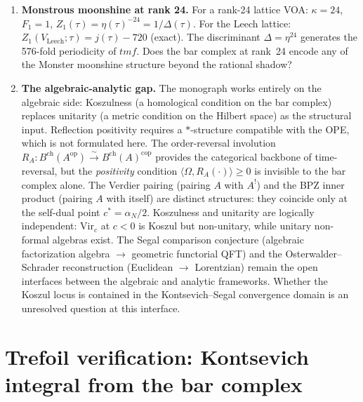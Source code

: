 \documentclass[11pt]{article}
\begin{document}
\begin{enumerate}
  class~$\mathbf{M}$ at $|c| < 6$ diverges geometrically
  with growth rate~$\rho > 1$.  Is this divergent series Borel
  summable?  The expected Stokes structure: in the Euclidean
  frame, the Borel singularities lie on the real axis at
  $\xi = 1/\rho$; the Wick rotation moves them to the imaginary
  axis, clearing the integration contour.
  The modular $S$-transform at the $q \to 1$ boundary
  plays the structural role of Borel resummation.
\item \textbf{Monstrous moonshine at rank 24.}
  For a rank-24 lattice VOA: $\kappa = 24$, $F_1 = 1$,
  $Z_1(\tau) = \eta(\tau)^{-24} = 1/\Delta(\tau)$.  For the
  Leech lattice: $Z_1(V_{\mathrm{Leech}};\tau)
  = j(\tau) - 720$ (exact).  The discriminant $\Delta
  = \eta^{24}$ generates the 576-fold periodicity of $\mathit{tmf}$.
  Does the bar complex at rank~24 encode any of the Monster
  moonshine structure beyond the rational shadow?
\item \textbf{The algebraic-analytic gap.}
  The monograph works entirely on the algebraic side:
  Koszulness (a homological condition on the bar complex)
  replaces unitarity (a metric condition on the Hilbert space)
  as the structural input.  Reflection positivity requires a
  $*$-structure compatible with the OPE, which is not formulated
  here.  The order-reversal involution
  $R_A \colon B^{\mathrm{ch}}(A^{\mathrm{op}})
  \xrightarrow{\sim} B^{\mathrm{ch}}(A)^{\mathrm{cop}}$
  provides the categorical backbone of time-reversal, but the
  \emph{positivity} condition $\langle \Omega, R_A(\cdot)\rangle
  \ge 0$ is invisible to the bar complex alone.  The Verdier
  pairing (pairing $A$ with $A^!$) and the BPZ inner product
  (pairing $A$ with itself) are distinct structures: they
  coincide only at the self-dual point $c^* = \alpha_N/2$.
  Koszulness and unitarity are logically independent:
  $\mathrm{Vir}_c$ at $c < 0$ is Koszul but non-unitary, while
  unitary non-formal algebras exist.  The Segal comparison
  conjecture (algebraic factorization algebra $\to$ geometric
  functorial QFT) and the Osterwalder--Schrader reconstruction
  (Euclidean $\to$ Lorentzian) remain the open interfaces between
  the algebraic and analytic frameworks.  Whether the Koszul locus
  is contained in the Kontsevich--Segal convergence domain is an
  unresolved question at this interface.
\end{enumerate}


\section{Trefoil verification: Kontsevich integral from the bar complex}
\label{sec:trefoil-bar-verification}
\end{document}
